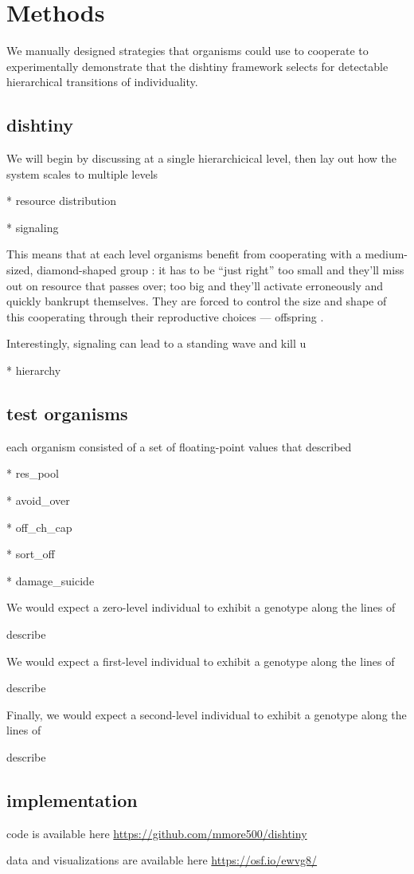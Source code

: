 \section{Methods}

We manually designed strategies that organisms could use to cooperate to experimentally demonstrate that the dishtiny framework selects for detectable hierarchical transitions of individuality.

\subsection{dishtiny}
We will begin by discussing at a single hierarchicical level, then lay out how the system scales to multiple levels

* resource distribution

* signaling

This means that at each level organisms benefit from cooperating with a medium-sized, diamond-shaped group : it has to be ``just right'' too small and they'll miss out on resource that passes over; too big and they'll activate erroneously and quickly bankrupt themselves.
They are forced to control the size and shape of this cooperating through their reproductive choices --- offspring .

Interestingly, signaling can lead to a standing wave and kill u

* hierarchy

\subsection{test organisms}

each organism consisted of a set of floating-point values that described

* res_pool

* avoid_over

* off_ch_cap

* sort_off

* damage_suicide

We would expect a zero-level individual to exhibit a genotype along the lines of

describe

We would expect a first-level individual to exhibit a genotype along the lines of

describe

Finally, we would expect a second-level individual to exhibit a genotype along the lines of

describe

\subsection{implementation}

code is available here \url{https://github.com/mmore500/dishtiny}

data and visualizations are available here \url{https://osf.io/ewvg8/}
